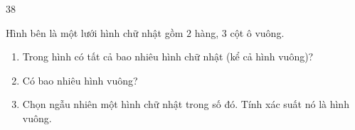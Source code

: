 \begin{probbox}{38}{}
\begin{minipage}[t]{0.62\linewidth}\vspace{0pt}
Hình bên là một lưới hình chữ nhật gồm $2$ hàng, $3$ cột ô vuông.
\begin{enumerate}[label=\alph*),leftmargin=1.5em,itemsep=0pt,topsep=2pt]
\item Trong hình có tất cả bao nhiêu hình chữ nhật (kể cả hình vuông)?
\item Có bao nhiêu hình vuông?
\item Chọn ngẫu nhiên một hình chữ nhật trong số đó. Tính xác suất nó là hình vuông.
\end{enumerate}
\end{minipage}\hfill
\begin{minipage}[t]{0.34\linewidth}\vspace{0pt}
\centering{}
\end{minipage}
\end{probbox}
